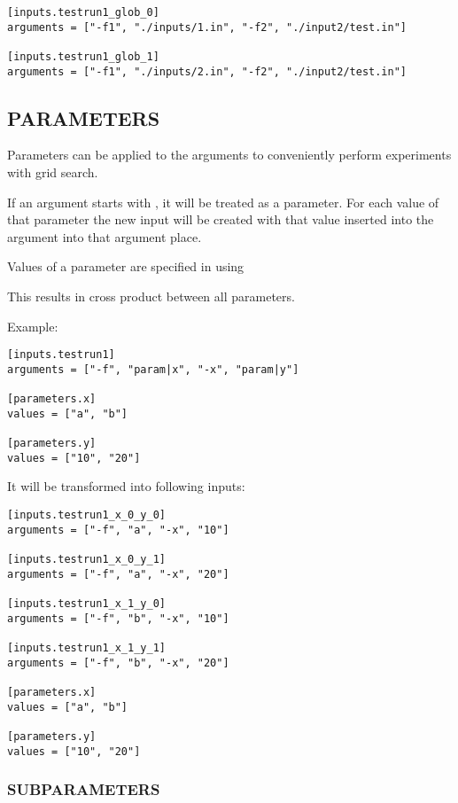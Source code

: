 \documentclass[a4paper,english]{article}
\begin{document}
\begin{adjustwidth}{18pt}{0pt}
      \begin{verbatim}
[inputs.testrun1_glob_0]
arguments = ["-f1", "./inputs/1.in", "-f2", "./input2/test.in"]

[inputs.testrun1_glob_1]
arguments = ["-f1", "./inputs/2.in", "-f2", "./input2/test.in"]
      \end{verbatim}

      \subsection{PARAMETERS}

        Parameters can be applied to the arguments to conveniently perform experiments with grid search.

            If an argument starts with , it will be treated as a parameter.
            For each value of that parameter the new input will be created with that value inserted into the argument
            into that argument place.

            Values of a parameter are specified in  using 

            This results in cross product between all parameters.

                Example:

        \begin{verbatim}
[inputs.testrun1]
arguments = ["-f", "param|x", "-x", "param|y"]

[parameters.x]
values = ["a", "b"]

[parameters.y]
values = ["10", "20"]
        \end{verbatim}

                It will be transformed into following inputs:

        \begin{verbatim}
[inputs.testrun1_x_0_y_0]
arguments = ["-f", "a", "-x", "10"]

[inputs.testrun1_x_0_y_1]
arguments = ["-f", "a", "-x", "20"]

[inputs.testrun1_x_1_y_0]
arguments = ["-f", "b", "-x", "10"]

[inputs.testrun1_x_1_y_1]
arguments = ["-f", "b", "-x", "20"]

[parameters.x]
values = ["a", "b"]

[parameters.y]
values = ["10", "20"]
        \end{verbatim}

    \subsubsection{SUBPARAMETERS}


\end{adjustwidth}
\end{document}

